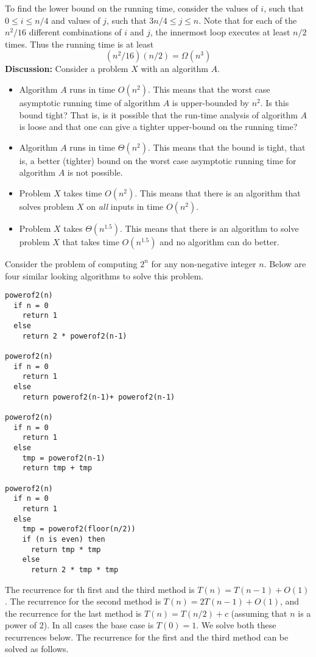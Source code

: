 \documentclass[11pt,twoside]{article}
\def\ni{\noindent}
\begin{document}
To find the lower bound on the running time, consider the values of
$i$, such that $0\leq i \leq n/4$ and values of $j$, such that $3n/4 \leq j
\leq n$. Note that for each of the $n^2/16$ different
combinations of $i$ and $j$, the innermost loop executes at least
$n/2$ times. Thus the running time is at least 
\[
(n^2/16)(n/2) = \Omega(n^3)
\]
\ni
\textbf{Discussion:} Consider a problem $X$ with an algorithm $A$.
\begin{itemize}
\item
Algorithm $A$ runs in time $O(n^2)$. This means that the worst case
asymptotic running time of algorithm $A$ is upper-bounded by $n^2$.
Is this bound tight? That is,
is it possible that the run-time analysis of algorithm $A$ is
loose and that one can give a tighter upper-bound on the running time?  
\item
Algorithm $A$ runs in time $\Theta(n^2)$. This means that the bound
is tight, that is, a better (tighter) bound on the worst case
asymptotic running time for algorithm $A$ is not possible. 
\item
Problem $X$ takes time $O(n^2)$. This means that there is
an algorithm that solves problem $X$ on \textit{all} inputs in time
$O(n^2)$. 
\item
Problem $X$ takes $\Theta(n^{1.5})$. This means that there is
an algorithm to solve problem $X$ that takes time $O(n^{1.5})$ and
no algorithm can do better.
\end{itemize}

Consider the problem of
computing $2^n$ for any non-negative integer $n$. 
Below are four similar looking algorithms to
solve this problem. 

\begin{verbatim}
powerof2(n)
  if n = 0 
    return 1
  else
    return 2 * powerof2(n-1)

powerof2(n)
  if n = 0 
    return 1
  else
    return powerof2(n-1)+ powerof2(n-1)

powerof2(n)
  if n = 0 
    return 1
  else
    tmp = powerof2(n-1)
    return tmp + tmp

powerof2(n)
  if n = 0 
    return 1
  else
    tmp = powerof2(floor(n/2))
    if (n is even) then
      return tmp * tmp
    else
      return 2 * tmp * tmp 
\end{verbatim}

The recurrence for th first and the third method is 
$T(n) = T(n-1) + O(1)$. The recurrence for the second method is 
$T(n) = 2T(n-1)+O(1)$, and the recurrence for the last method is
$T(n)=T(n/2)+c$ (assuming that $n$ is a power of 2). 
In all cases the base case is $T(0) = 1$.  We
solve both these recurrences below. The recurrence for the first and
the third method can be solved as follows.\\
\end{document}

